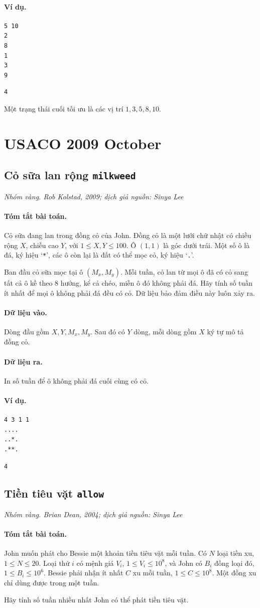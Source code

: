 \documentclass[11pt]{article}
\newcommand{\problem}[4]{%
  \subsection[#1 (#2)]{#1 \hfill {\normalsize\texttt{#2}}}%
  \noindent\textit{#3. #4}\par\smallskip
}
\newcommand{\iosec}[1]{\paragraph{#1}}
\begin{document}
\iosec{Ví dụ.}
\begin{verbatim}
5 10
2
8
1
3
9
\end{verbatim}

\begin{verbatim}
4
\end{verbatim}

Một trạng thái cuối tối ưu là các vị trí \(1,3,5,8,10\).

\section{USACO 2009 October}

\problem{Cỏ sữa lan rộng}{milkweed}{Nhóm vàng}{Rob Kolstad, 2009; dịch giả nguồn: Sinya Lee}

\iosec{Tóm tắt bài toán.}
Cỏ sữa đang lan trong đồng cỏ của John. Đồng cỏ là một lưới chữ nhật có
chiều rộng \(X\), chiều cao \(Y\), với \(1\le X,Y\le 100\). Ô \((1,1)\) là
góc dưới trái. Một số ô là đá, ký hiệu `\texttt{*}', các ô còn lại là đất có
thể mọc cỏ, ký hiệu `\texttt{.}'.

Ban đầu cỏ sữa mọc tại ô \((M_x,M_y)\). Mỗi tuần, cỏ lan từ mọi ô đã có cỏ
sang tất cả ô kề theo \(8\) hướng, kể cả chéo, miễn ô đó không phải đá. Hãy
tính số tuần ít nhất để mọi ô không phải đá đều có cỏ. Dữ liệu bảo đảm điều
này luôn xảy ra.

\iosec{Dữ liệu vào.}
Dòng đầu gồm \(X,Y,M_x,M_y\). Sau đó có \(Y\) dòng, mỗi dòng gồm \(X\) ký tự
mô tả đồng cỏ.

\iosec{Dữ liệu ra.}
In số tuần để ô không phải đá cuối cùng có cỏ.

\iosec{Ví dụ.}
\begin{verbatim}
4 3 1 1
....
..*.
.**.
\end{verbatim}

\begin{verbatim}
4
\end{verbatim}

\problem{Tiền tiêu vặt}{allow}{Nhóm vàng}{Brian Dean, 2004; dịch giả nguồn: Sinya Lee}

\iosec{Tóm tắt bài toán.}
John muốn phát cho Bessie một khoản tiền tiêu vặt mỗi tuần. Có \(N\) loại
tiền xu, \(1\le N\le 20\). Loại thứ \(i\) có mệnh giá \(V_i\),
\(1\le V_i\le 10^8\), và John có \(B_i\) đồng loại đó,
\(1\le B_i\le 10^6\). Bessie phải nhận ít nhất \(C\) xu mỗi tuần,
\(1\le C\le 10^8\). Một đồng xu chỉ dùng được trong một tuần.

Hãy tính số tuần nhiều nhất John có thể phát tiền tiêu vặt.
\end{document}
